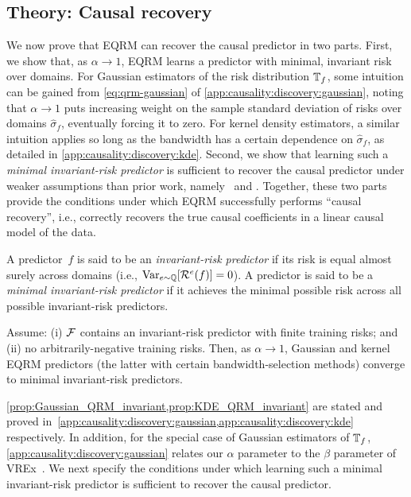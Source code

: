 \documentclass{article}
\begin{document}
\subsection{Theory: Causal recovery}\label{sec:qrm_algs:causality}
%
We now prove that EQRM can recover the causal predictor in two parts. First, we show that, as $\alpha \to 1$, EQRM learns a predictor with minimal, invariant risk over domains. For Gaussian estimators of the risk distribution $\mathbb{T}_f$, some intuition can be gained from \cref{eq:qrm-gaussian} of \cref{app:causality:discovery:gaussian}, noting that $\alpha \to 1$ puts increasing weight on the sample standard deviation of risks over domains $\hat{\sigma}_f$, eventually forcing it to zero.
%
For kernel density estimators, a similar intuition applies so long as the bandwidth has a certain dependence on $\hat{\sigma}_f$, as detailed in \cref{app:causality:discovery:kde}. Second, we show that learning such a \emph{minimal invariant-risk predictor} is sufficient to recover the causal predictor under weaker assumptions than prior work, namely~\citet{peters2016causal} and \citet{krueger21rex}. Together, these two parts provide the conditions under which EQRM successfully performs ``causal recovery'', i.e., correctly recovers the true causal coefficients in a linear causal model of the data.
%
%
\begin{definition}\upshape
A predictor~$f$ is said to be an \emph{invariant-risk predictor} if its risk is equal almost surely across domains (i.e., $\operatorname{Var}_{e \sim \mathbb{Q}}[\mathcal{R}^e(f)] = 0$).  A predictor is said to be a \emph{minimal invariant-risk predictor} if it achieves the minimal possible risk across all possible invariant-risk predictors.
\end{definition}
%
\begin{proposition}
    Assume: (i) $\mathcal{F}$ contains an invariant-risk predictor 
    with finite training risks; and (ii) no arbitrarily-negative training risks.  Then, as $\alpha\! \to\! 1$, Gaussian and kernel EQRM predictors (the latter with certain bandwidth-selection methods) converge to minimal invariant-risk predictors.
    \label{prop:equalize_main}
\end{proposition}%
%
%
%
%
\cref{prop:Gaussian_QRM_invariant,prop:KDE_QRM_invariant} are stated and proved in~\cref{app:causality:discovery:gaussian,app:causality:discovery:kde} respectively. In addition, for the special case of Gaussian estimators of $\mathbb{T}_f$, \cref{app:causality:discovery:gaussian} relates our $\alpha$ parameter to the $\beta$ parameter of VREx~\cite[Eq.~8]{krueger21rex}. We next specify the conditions under which learning such a minimal invariant-risk predictor is sufficient to recover the causal predictor.
\end{document}
